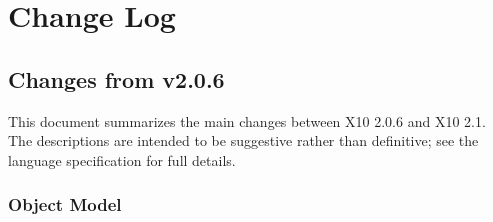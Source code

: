\chapter{Change Log}

\section{Changes from \Xten{} v2.0.6}

This document summarizes the main changes between X10 2.0.6 and X10 2.1.  The
descriptions are intended to be suggestive rather than definitive; see the
language specification for full details.

\subsection{Object Model}


